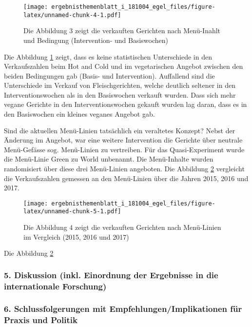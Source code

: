 \documentclass[12pt,ngerman,]{article}
\begin{document}
\begin{figure}
\centering
\texttt{[image: ergebnisthemenblatt\_i\_181004\_egel\_files/figure-latex/unnamed-chunk-4-1.pdf]}
\caption{\label{fig:fig3} Die Abbildung 3 zeigt die verkauften Gerichten
nach Menü-Inahlt und Bedingung (Intervention- und Basiswochen)}
\end{figure}

Die Abbildung \ref{fig:fig3} zeigt, dass es keine statistischen
Unterschiede in den Verkaufszahlen beim Hot and Cold und im
vegetarischen Angebot zwischen den beiden Bedingungen gab (Basis- und
Intervention). Auffallend sind die Unterschiede im Verkauf von
Fleischgerichten, welche deutlich seltener in den Interventionswochen
als in den Basiswochen verkauft wurden. Dass sich mehr vegane Gerichte
in den Interventionswochen gekauft wurden lag daran, dass es in den
Basiswochen ein kleines veganes Angebot gab.

Sind die aktuellen Menü-Linien tatsächlich ein veraltetes Konzept? Nebst
der Änderung im Angebot, war eine weitere Intervention die Gerichte über
neutrale Menü-Gefässe sog. Menü-Linien zu vertreiben. Für das
Quasi-Experiment wurde die Menü-Linie Green zu World unbenannt. Die
Menü-Inhalte wurden randomisiert über diese drei Menü-Linien angeboten.
Die Abbildung \ref{fig:fig4} vergleicht die Verkaufszahlen gemessen an
den Menü-Linien über die Jahren 2015, 2016 und 2017.

\begin{figure}
\centering
\texttt{[image: ergebnisthemenblatt\_i\_181004\_egel\_files/figure-latex/unnamed-chunk-5-1.pdf]}
\caption{\label{fig:fig4} Die Abbildung 4 zeigt die verkauften Gerichten
nach Menü-Linien im Vergleich (2015, 2016 und 2017)}
\end{figure}

Die Abbildung \ref {fig:fig4}

\hypertarget{diskussion-inkl.-einordnung-der-ergebnisse-in-die-internationale-forschung}{%
\subsubsection{5. Diskussion (inkl. Einordnung der Ergebnisse in die
internationale
Forschung)}\label{diskussion-inkl.-einordnung-der-ergebnisse-in-die-internationale-forschung}}

\hypertarget{schlussfolgerungen-mit-empfehlungenimplikationen-fur-praxis-und-politik}{%
\subsubsection{6. Schlussfolgerungen mit Empfehlungen/Implikationen für
Praxis und
Politik}\label{schlussfolgerungen-mit-empfehlungenimplikationen-fur-praxis-und-politik}}
\end{document}
